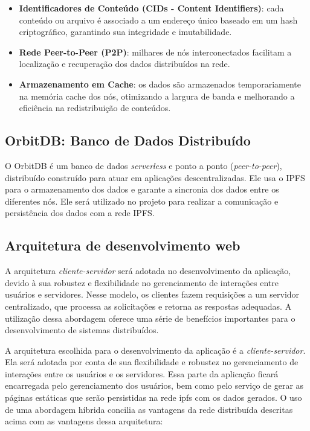 \begin{itemize}
    \item \textbf{Identificadores de Conteúdo (CIDs - Content Identifiers)}: cada conteúdo ou arquivo é associado a um endereço único baseado em um hash criptográfico, garantindo sua integridade e imutabilidade.
    
    \item \textbf{Rede Peer-to-Peer (P2P)}: milhares de nós interconectados facilitam a localização e recuperação dos dados distribuídos na rede.
    
    \item \textbf{Armazenamento em Cache}: os dados são armazenados temporariamente na memória cache dos nós, otimizando a largura de banda e melhorando a eficiência na redistribuição de conteúdos.
\end{itemize}

\subsection{OrbitDB: Banco de Dados Distribuído}

O OrbitDB é um banco de dados \textit{serverless} e ponto a ponto (\textit{peer-to-peer}), distribuído construído para atuar em aplicações descentralizadas. Ele usa o IPFS para o armazenamento dos dados e garante a sincronia dos dados entre os diferentes nós. Ele será utilizado no projeto para realizar a comunicação e persistência dos dados com a rede IPFS.

\subsection{Arquitetura de desenvolvimento web}

A arquitetura \textit{cliente-servidor} será adotada no desenvolvimento da aplicação, devido à sua robustez e flexibilidade no gerenciamento de interações entre usuários e servidores. Nesse modelo, os clientes fazem requisições a um servidor centralizado, que processa as solicitações e retorna as respostas adequadas. A utilização dessa abordagem oferece uma série de benefícios importantes para o desenvolvimento de sistemas distribuídos.


A arquitetura escolhida para o desenvolvimento da aplicação é a \textit{cliente-servidor}. Ela será adotada por conta de sua flexibilidade e robustez no gerenciamento de interações entre os usuários e os servidores. Essa parte da aplicação ficará encarregada pelo gerenciamento dos usuários, bem como pelo serviço de gerar as páginas estáticas que serão persistidas na rede ipfs com os dados gerados. O uso de uma abordagem híbrida concilia as vantagens da rede distribuída descritas acima com as vantagens dessa arquitetura:

